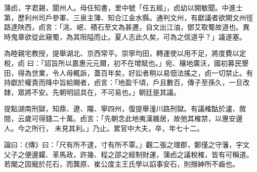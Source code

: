 \begin{pinyinscope}
 蒲卣，字君錫，閬州人。母任知書，里中號「任五經」，卣幼以開敏聞。中進士第，歷利州司戶參軍、三泉主簿、知合江金水縣。通判文州，有獻議者欲開文州徑路達陜西，卣言：「洮、岷、積石至文為甚邇，自文出江油，鄧艾取蜀故道也。異時鬼章欲從此窺蜀，為其阻隘而止。夏人志此久矣，可為之信道乎？」議遂塞。



 為睦親宅教授，提舉湖北、京西常平。崇寧均田，轉運使以用不足，將度費以定稅，卣
 曰：「詔旨所以嘉惠元元爾，初不在增賦也。」宛、穰地廣沃，國初募民墾田，得為世業，令人毋輒訴，蓋百年矣，好訟者稍以易佃法搖之，卣一切禁止。有持獻於權貴而降中旨給賜者，卣言：「地盈千頃，戶且數百，傳子至孫久，一旦改隸，眾將不安。先朝明詔具在，不可易也。」朝廷是其議。



 提點湖南刑獄，知鼎、遼、隴、寧四州，復提舉潼川路刑獄。有議榷酤於瀘、敘間，云歲可得錢二十萬。卣言：「先朝念此地夷漢雜居，故弛其榷禁，以惠安邊人。今之所行，
 未見其利。」乃止。累官中大夫，卒，年七十二。



 論曰：《傳》曰：「尺有所不逮，寸有所不覃。」觀二張之理郡，鄭僅之守藩，宇文父子之便邊糶、革馬政，許幾、程之邵之經制財運，蒲卣之議稅榷，皆有可稱道。若閣之固寵於花石，而龔原、崔公度主王氏學以諂事安石，則搢紳所不齒也。



\end{pinyinscope}